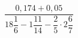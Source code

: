\begin{ex}[type=calculate]
	\begin{condition}
		\( \dfrac{0,174+0,05}{18\dfrac{1}{6}-1\dfrac{11}{14}-\dfrac{2}{5}\cdot2\dfrac{6}{7}} \)
	\end{condition}
	\answer{}
\end{ex}
